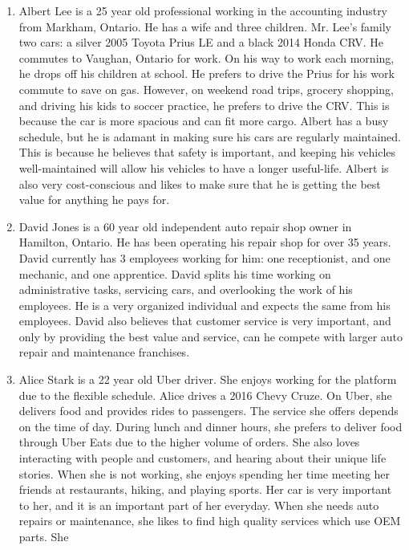\documentclass[12pt]{article}
\begin{document}
\begin{enumerate}
	\item Albert Lee is a 25 year old professional working in the accounting industry from Markham, Ontario.
	      He has a wife and three children. Mr. Lee's family two cars: a silver 2005 Toyota Prius LE and a
	      black 2014 Honda CRV. He commutes to Vaughan, Ontario for work. On his way to work each morning, he
	      drops off his children at school. He prefers to drive the Prius for his work commute to save on
	      gas. However, on weekend road trips, grocery shopping, and driving his kids to soccer practice, he
	      prefers to drive the CRV. This is because the car is more spacious and can fit more cargo. Albert
	      has a busy schedule, but he is adamant in making sure his cars are regularly maintained. This is
	      because he believes that safety is important, and keeping his vehicles well-maintained will allow
	      his vehicles to have a longer useful-life. Albert is also very cost-conscious and likes to make
	      sure that he is getting the best value for anything he pays for.
	\item David Jones is a 60 year old independent auto repair shop owner in Hamilton, Ontario. He has been
	      operating his repair shop for over 35 years. David currently has 3 employees working for him: one
	      receptionist, and one mechanic, and one apprentice. David splits his time working on administrative
	      tasks, servicing cars, and overlooking the work of his employees. He is a very organized individual
	      and expects the same from his employees. David also believes that customer service is very
	      important, and only by providing the best value and service, can he compete with larger auto repair
	      and maintenance franchises.
	\item Alice Stark is a 22 year old Uber driver. She enjoys working for the platform due to the flexible
	      schedule. Alice drives a 2016 Chevy Cruze. On Uber, she delivers food and provides rides to
	      passengers. The service she offers depends on the time of day. During lunch and dinner hours, she
	      prefers to deliver food through Uber Eats due to the higher volume of orders. She also loves
	      interacting with people and customers, and hearing about their unique life stories. When she is not
	      working, she enjoys spending her time meeting her friends at restaurants, hiking, and playing
	      sports. Her car is very important to her, and it is an important part of her everyday. When she
	      needs auto repairs or maintenance, she likes to find high quality services which use OEM parts. She

\end{enumerate}
\end{document}
